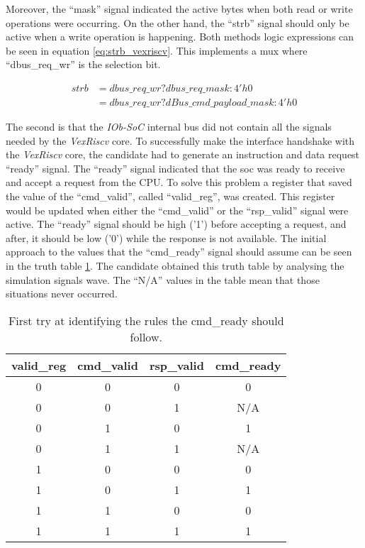 Moreover, the \enquote{mask} signal indicated the active bytes when both read or write operations were occurring. On the other hand, the \enquote{strb} signal should only be active when a write operation is happening. Both methods logic expressions can be seen in equation \ref{eq:strb_vexriscv}. This implements a \acrshort{mux} where \enquote{dbus\_req\_wr} is the selection bit.

\begin{equation}
  \begin{split}
  strb& = dbus\_req\_wr ? dbus\_req\_mask : 4'h0 \\
      & = dbus\_req\_wr ? dBus\_cmd\_payload\_mask : 4'h0
  \end{split}
  \label{eq:strb_vexriscv}
\end{equation}

The second is that the \textit{IOb-SoC} internal bus did not contain all the signals needed by the \textit{VexRiscv} core. To successfully make the interface handshake with the \textit{VexRiscv} core, the candidate had to generate an instruction and data request \enquote{ready} signal. The \enquote{ready} signal indicated that the \acrshort{soc} was ready to receive and accept a request from the CPU. To solve this problem a register that saved the value of the \enquote{cmd\_valid}, called \enquote{valid\_reg}, was created. This register would be updated when either the \enquote{cmd\_valid} or the \enquote{rsp\_valid} signal were active. The \enquote{ready} signal should be high ('1') before accepting a request, and after, it should be low ('0') while the response is not available. The initial approach to the values that the \enquote{cmd\_ready} signal should assume can be seen in the truth table \ref{tab:first_truth_table}. The candidate obtained this truth table by analysing the simulation signals wave. The \enquote{N/A} values in the table mean that those situations never occurred.

\begin{table}[!h]
  \centering
  \begin{tabular}{ccc|c}
  valid\_reg & cmd\_valid & rsp\_valid & cmd\_ready \\ \hline
  0          & 0          & 0          & 0          \\
  0          & 0          & 1          & N/A        \\
  0          & 1          & 0          & 1          \\
  0          & 1          & 1          & N/A        \\
  1          & 0          & 0          & 0          \\
  1          & 0          & 1          & 1          \\
  1          & 1          & 0          & 0          \\
  1          & 1          & 1          & 1         
  \end{tabular}
  \caption{First try at identifying the rules the cmd\_ready should follow.}
  \label{tab:first_truth_table}
\end{table}

